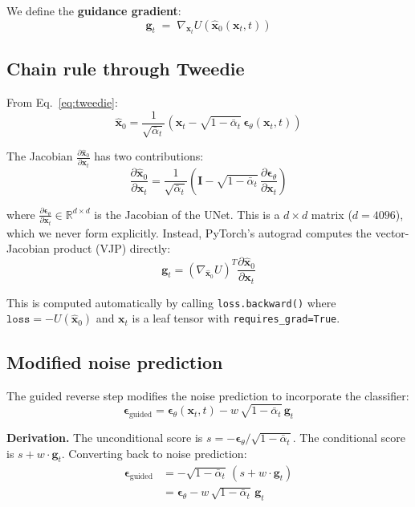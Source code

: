 \documentclass[11pt]{article}
\newcommand{\xb}{\mathbf{x}}
\newcommand{\eb}{\boldsymbol{\epsilon}}
\newcommand{\gb}{\mathbf{g}}
\newcommand{\Ib}{\mathbf{I}}
\newcommand{\R}{\mathbb{R}}
\newcommand{\alphabar}{\bar{\alpha}}
\begin{document}
We define the \textbf{guidance gradient}:
\begin{equation}
    \gb_t \;=\; \nabla_{\xb_t} U\!\left(\hat{\xb}_0(\xb_t, t)\right)
    \label{eq:g_def}
\end{equation}

\subsection{Chain rule through Tweedie}

From Eq.~\eqref{eq:tweedie}:
\begin{equation}
    \hat{\xb}_0 = \frac{1}{\sqrt{\alphabar_t}}
    \left(\xb_t - \sqrt{1 - \alphabar_t}\, \eb_\theta(\xb_t, t)\right)
\end{equation}

The Jacobian $\frac{\partial \hat{\xb}_0}{\partial \xb_t}$ has two contributions:
\begin{equation}
    \frac{\partial \hat{\xb}_0}{\partial \xb_t}
    = \frac{1}{\sqrt{\alphabar_t}}
    \left(\Ib - \sqrt{1 - \alphabar_t}\, \frac{\partial \eb_\theta}{\partial \xb_t}\right)
    \label{eq:tweedie_jacobian}
\end{equation}

where $\frac{\partial \eb_\theta}{\partial \xb_t} \in \R^{d \times d}$ is the Jacobian
of the UNet. This is a $d \times d$ matrix ($d = 4096$), which we never form explicitly.
Instead, PyTorch's autograd computes the vector-Jacobian product (VJP) directly:
\begin{equation}
    \gb_t = \left(\nabla_{\hat{\xb}_0} U\right)^T
    \frac{\partial \hat{\xb}_0}{\partial \xb_t}
\end{equation}

This is computed automatically by calling \texttt{loss.backward()} where
$\texttt{loss} = -U(\hat{\xb}_0)$ and $\xb_t$ is a leaf tensor with \texttt{requires\_grad=True}.

\subsection{Modified noise prediction}

The guided reverse step modifies the noise prediction to incorporate the classifier:
\begin{equation}
    \eb_{\text{guided}} = \eb_\theta(\xb_t, t)
    - w\,\sqrt{1 - \alphabar_t}\, \gb_t
    \label{eq:eps_guided}
\end{equation}

\textbf{Derivation.} The unconditional score is $s = -\eb_\theta / \sqrt{1-\alphabar_t}$.
The conditional score is $s + w \cdot \gb_t$. Converting back to noise prediction:
\begin{align}
    \eb_{\text{guided}}
    &= -\sqrt{1-\alphabar_t}\,(s + w \cdot \gb_t) \\
    &= \eb_\theta - w\,\sqrt{1-\alphabar_t}\, \gb_t
\end{align}
\end{document}
